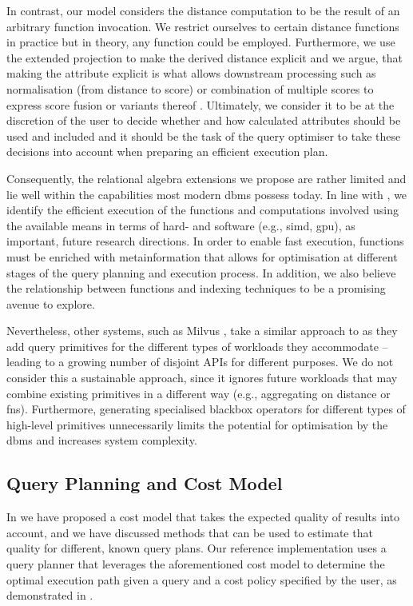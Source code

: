 In contrast, our model considers the distance computation to be the result of an arbitrary function invocation. We restrict ourselves to certain distance functions in practice but in theory, any function could be employed. Furthermore, we use the extended projection to make the derived distance explicit and we argue, that making the attribute explicit is what allows downstream processing such as normalisation (from distance to score) or combination of multiple scores to express score fusion or variants thereof \cite{Bohm:2001Fast}. Ultimately, we consider it to be at the discretion of the user to decide whether and how calculated attributes should be used and included and it should be the task of the query optimiser to take these decisions into account when preparing an efficient execution plan.

Consequently, the relational algebra extensions we propose are rather limited and lie well within the capabilities most modern \acrshort{dbms} possess today. In line with \cite{Abadi:2014Beckman,Abadi:2020Seattle}, we identify the efficient execution of the functions and computations involved using the available means in terms of hard- and software (e.g., \acrshort{simd}, \acrshort{gpu}), as important, future research directions. In order to enable fast execution, functions must be enriched with metainformation that allows for optimisation at different stages of the query planning and execution process. In addition, we also believe the relationship between functions and indexing techniques to be a promising avenue to explore. 

Nevertheless, other systems, such as Milvus \cite{Wang:2021Milvus}, take a similar approach to \cite{Giangreco:2016Adam} as they add query primitives for the different types of workloads they accommodate -- leading to a growing number of disjoint APIs for different purposes. We do not consider this a sustainable approach, since it ignores future workloads that may combine existing primitives in a different way (e.g., aggregating on distance or \acrshort{fns}). Furthermore, generating specialised blackbox operators for different types of high-level primitives unnecessarily limits the potential for optimisation by the \acrshort{dbms} and increases system complexity. 

\subsection{Query Planning and Cost Model}  
In  we have proposed a cost model that takes the expected quality of results into account, and we have discussed methods that can be used to estimate that quality for different, known query plans. Our reference implementation \cottontail{} uses a query planner that leverages the aforementioned cost model to determine the optimal execution path given a query and a cost policy specified by the user, as demonstrated in .

